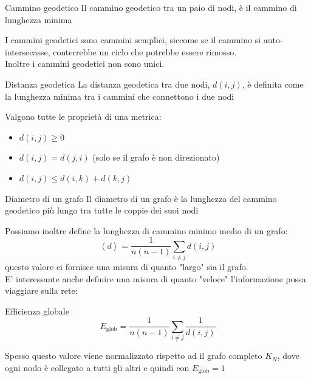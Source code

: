 \begin{boxb}{Cammino geodetico}
  Il cammino geodetico tra un paio di nodi, è il cammino di lunghezza minima
\end{boxb}
I cammini geodetici sono cammini semplici, siccome se il cammino si auto-intersecasse, conterrebbe un ciclo che potrebbe essere rimosso.\\
Inoltre i cammini geodetici non sono unici.\\

\begin{boxb}{Distanza geodetica}
La distanza geodetica tra due nodi, $d(i,j)$, è definita come la lunghezza minima tra i cammini che connettono i due nodi
\end{boxb}

Valgono tutte le proprietà di una metrica:
\begin{itemize}
  \item $d(i,j) \ge 0$
  \item $d(i,j)=d(j,i)$   (solo se il grafo è non direzionato)
  \item $d(i,j) \le d(i,k)+d(k,j)$
\end{itemize}

\begin{boxb}{Diametro di un grafo}
  Il diametro di un grafo è la lunghezza del cammino geodetico più lungo tra tutte le coppie dei suoi nodi
\end{boxb}
Possiamo inoltre define la lunghezza di cammino minimo medio di un grafo:
\begin{equation}
  \left\langle d \right\rangle=\frac{1}{n(n-1)}\sum_{i\not=j}^{}d(i,j)
\end{equation}
questo valore ci fornisce una misura di quanto "largo" sia il grafo.\\

E' interessante anche definire una misura di quanto "veloce" l'informazione possa viaggiare sulla rete:
\begin{boxb}{Efficienza globale}
  \begin{equation}
        E_{\text{glob}}=\frac{1}{n(n-1)}\sum_{i\not=j}^{}\frac{1}{d(i,j)}
  \end{equation}
\end{boxb}
Spesso questo valore viene normalizzato rispetto ad il grafo completo $K_N$, dove ogni nodo è collegato a tutti gli altri e quindi con $E_{\text{glob}}=1$
